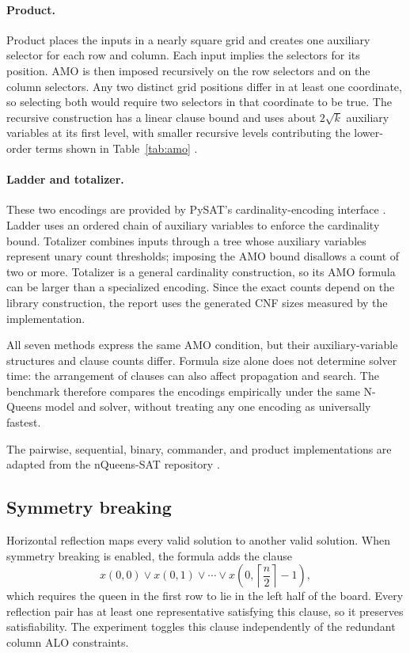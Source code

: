 \documentclass[a4paper,fleqn]{cas-sc}
\begin{document}
\paragraph{Product.}
Product places the inputs in a nearly square grid and creates one auxiliary selector for each row and column. Each input implies the selectors for its position. AMO is then imposed recursively on the row selectors and on the column selectors. Any two distinct grid positions differ in at least one coordinate, so selecting both would require two selectors in that coordinate to be true. The recursive construction has a linear clause bound and uses about $2\sqrt{k}$ auxiliary variables at its first level, with smaller recursive levels contributing the lower-order terms shown in Table~\ref{tab:amo} \cite{Chen2010}.

\paragraph{Ladder and totalizer.}
These two encodings are provided by PySAT's cardinality-encoding interface \cite{Ignatiev2018}. Ladder uses an ordered chain of auxiliary variables to enforce the cardinality bound. Totalizer combines inputs through a tree whose auxiliary variables represent unary count thresholds; imposing the AMO bound disallows a count of two or more. Totalizer is a general cardinality construction, so its AMO formula can be larger than a specialized encoding. Since the exact counts depend on the library construction, the report uses the generated CNF sizes measured by the implementation.

All seven methods express the same AMO condition, but their auxiliary-variable structures and clause counts differ. Formula size alone does not determine solver time: the arrangement of clauses can also affect propagation and search. The benchmark therefore compares the encodings empirically under the same N-Queens model and solver, without treating any one encoding as universally fastest.

The pairwise, sequential, binary, commander, and product implementations are adapted from the nQueens-SAT repository \cite{DuongsunyNQueensSAT}.

\subsection{Symmetry breaking}
Horizontal reflection maps every valid solution to another valid solution. When symmetry breaking is enabled, the formula adds the clause
\begin{equation}
  x(0,0)\lor x(0,1)\lor\cdots\lor x\!\left(0,\left\lceil\frac{n}{2}\right\rceil-1\right),
\end{equation}
which requires the queen in the first row to lie in the left half of the board. Every reflection pair has at least one representative satisfying this clause, so it preserves satisfiability. The experiment toggles this clause independently of the redundant column ALO constraints.
\end{document}
